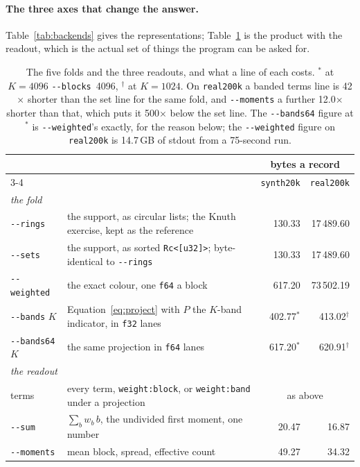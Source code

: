 \documentclass[11pt,a4paper]{article}
\newcommand{\flag}[1]{\texttt{-{}-#1}}
\begin{document}
\paragraph{The three axes that change the answer.}
Table~\ref{tab:backends} gives the representations; Table~\ref{tab:answers} is
the product with the readout, which is the actual set of things the program can
be asked for.

\begin{table}[tp]
\centering\small
\begin{tabular}{lp{}rr}
\toprule
 & & \multicolumn{2}{c}{bytes a record} \\
\cmidrule(l){3-4}
 & & \texttt{synth20k} & \texttt{real200k} \\
\midrule
\multicolumn{4}{l}{\emph{the fold}} \\
\flag{rings}     & the support, as circular lists; the Knuth exercise, kept as the reference & 130.33 & 17\,489.60 \\
\flag{sets}      & the support, as sorted \texttt{Rc<[u32]>}; byte-identical to \flag{rings} & 130.33 & 17\,489.60 \\
\flag{weighted}  & the exact colour, one \texttt{f64} a block & 617.20 & 73\,502.19 \\
\flag{bands} $K$ & Equation~\eqref{eq:project} with $P$ the $K$-band indicator, in \texttt{f32} lanes & 402.77$^\ast$ & 413.02$^\dagger$ \\
\flag{bands64} $K$ & the same projection in \texttt{f64} lanes & 617.20$^\ast$ & 620.91$^\dagger$ \\
\midrule
\multicolumn{4}{l}{\emph{the readout}} \\
terms            & every term, \texttt{weight:block}, or \texttt{weight:band} under a projection & \multicolumn{2}{c}{as above} \\
\flag{sum}       & $\sum_b w_b\, b$, the undivided first moment, one number & 20.47 & 16.87 \\
\flag{moments}   & mean block, spread, effective count & 49.27 & 34.32 \\
\bottomrule
\end{tabular}
\caption{The five folds and the three readouts, and what a line of each costs.
$^\ast$ at $K=4096$ \flag{blocks}~4096, $^\dagger$ at $K=1024$. On
\texttt{real200k} a banded terms line is 42$\times$ shorter than the set line
for the same fold, and \flag{moments} a further 12.0$\times$ shorter than
that, which puts it 500$\times$ below the set line. The
\flag{bands64} figure at $^\ast$ is \flag{weighted}'s exactly, for the reason
below; the \flag{weighted} figure on \texttt{real200k} is 14.7\,GB of stdout
from a 75-second run.}
\label{tab:answers}
\end{table}
\end{document}
